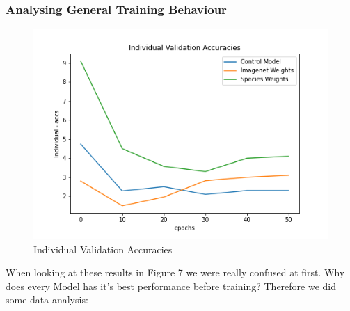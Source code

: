 \subsubsection{Analysing General Training Behaviour}

\begin{figure}[ht] 
        \centering \includegraphics[width=1\columnwidth]{figures/sieamesevalacc.png}
        \caption{\label{fig:sialoss} Individual Validation Accuracies}
\end{figure} \noindent 
When looking at these results in Figure 7 we were really confused at first. Why does every Model has it's best performance before training? Therefore we did some data analysis:

